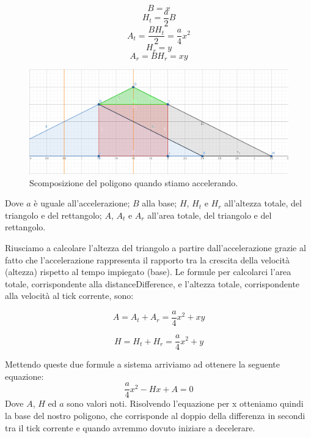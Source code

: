 \documentclass[main.tex]{subfiles}
\begin{document}
\begin{itemize}
    \begin{minipage}{.475\textwidth}
        \[B = x\]
        \[H_t = \frac{a}{2}B\]
        \[A_t = \frac{BH_t}{2} = \frac{a}{4}x^2\]
        \[H_r = y\]
        \[A_r = BH_r = xy\]
    \end{minipage}
    \begin{minipage}{.475\textwidth}
        \begin{figure}[H]
            \centering
            \includegraphics[width=1\linewidth]{img/interpolazione/compensateLateCallAccel2.png}
            \caption{Scomposizione del poligono quando stiamo accelerando.}
            \label{fig:4_compensateLateCallAccel2}
        \end{figure}
    \end{minipage}
    
    Dove $a$ è uguale all'accelerazione; $B$ alla base; $H$, $H_t$ e $H_r$ all'altezza totale, del triangolo e del rettangolo; $A$, $A_t$ e $A_r$ all'area totale, del triangolo e del rettangolo.
    
    Riusciamo a calcolare l'altezza del triangolo a partire dall'accelerazione grazie al fatto che l'accelerazione rappresenta il rapporto tra la crescita della velocità (altezza) rispetto al tempo impiegato (base).\newline
    Le formule per calcolarci l'area totale, corrispondente alla distanceDifference, e l'altezza totale, corrispondente alla velocità al tick corrente, sono:
    \hspace{2cm}
    
    \begin{minipage}{.45\textwidth}\[A = A_t + A_r = \frac{a}{4}x^2 + xy\]\end{minipage}
    \begin{minipage}{.45\textwidth}\[H = H_t + H_r = \frac{a}{4}x^2 + y\]\end{minipage}
    
    Mettendo queste due formule a sistema arriviamo ad ottenere la seguente equazione:
    \[\frac{a}{4}x^2 - Hx + A = 0\]
    Dove $A$, $H$ ed $a$ sono valori noti. Risolvendo l'equazione per x otteniamo quindi la base del nostro poligono, che corrisponde al doppio della differenza in secondi tra il tick corrente e quando avremmo dovuto iniziare a decelerare.
\end{itemize}
\end{document}
